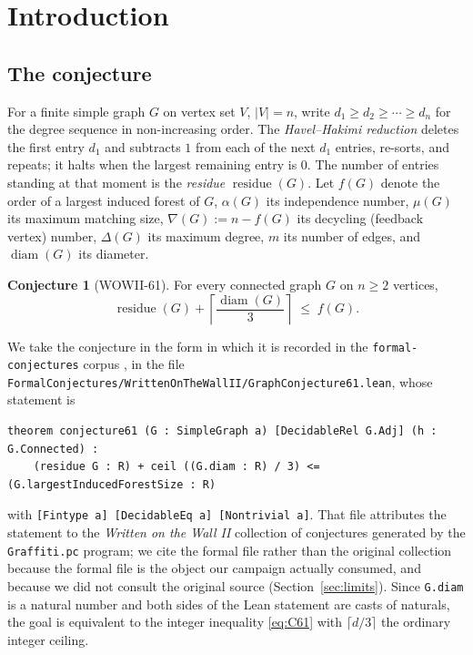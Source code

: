 \documentclass[11pt]{article}
\theoremstyle{plain}
\theoremstyle{definition}
\newtheorem{conjecture}[theorem]{Conjecture}
\theoremstyle{remark}
\numberwithin{equation}{section}
\DeclareMathOperator{\res}{residue}
\DeclareMathOperator{\diam}{diam}
\begin{document}
\tableofcontents

\section{Introduction}\label{sec:intro}

\subsection{The conjecture}\label{sec:statement}

For a finite simple graph $G$ on vertex set $V$, $|V| = n$, write $d_1 \ge d_2 \ge \cdots
\ge d_n$ for the degree sequence in non-increasing order. The \emph{Havel--Hakimi
reduction} deletes the first entry $d_1$ and subtracts $1$ from each of the next $d_1$
entries, re-sorts, and repeats; it halts when the largest remaining entry is $0$. The
number of entries standing at that moment is the \emph{residue} $\res(G)$. Let $f(G)$
denote the order of a largest induced forest of $G$, $\alpha(G)$ its independence number,
$\mu(G)$ its maximum matching size, $\nabla(G) := n - f(G)$ its decycling (feedback vertex)
number, $\Delta(G)$ its maximum degree, $m$ its number of edges, and $\diam(G)$ its
diameter.

\begin{conjecture}[WOWII-61]\label{conj:main}
For every connected graph $G$ on $n \ge 2$ vertices,
\begin{equation}\label{eq:C61}
\res(G) + \left\lceil \frac{\diam(G)}{3} \right\rceil \;\le\; f(G).
\tag{C61}
\end{equation}
\end{conjecture}

We take the conjecture in the form in which it is recorded in the
\texttt{formal-conjectures} corpus \cite{formalconjectures}, in the file
\texttt{FormalConjectures/WrittenOnTheWallII/GraphConjecture61.lean}, whose statement is
\begin{verbatim}
theorem conjecture61 (G : SimpleGraph a) [DecidableRel G.Adj] (h : G.Connected) :
    (residue G : R) + ceil ((G.diam : R) / 3) <= (G.largestInducedForestSize : R)
\end{verbatim}
with \texttt{[Fintype a] [DecidableEq a] [Nontrivial a]}. That file attributes the
statement to the \emph{Written on the Wall II} collection of conjectures generated by the
\texttt{Graffiti.pc} program; we cite the formal file rather than the original collection
because the formal file is the object our campaign actually consumed, and because we did
not consult the original source (Section~\ref{sec:limits}). Since \texttt{G.diam} is a
natural number and both sides of the Lean statement are casts of naturals, the goal is
equivalent to the integer inequality \eqref{eq:C61} with $\lceil d/3 \rceil$ the ordinary
integer ceiling.
\end{document}
